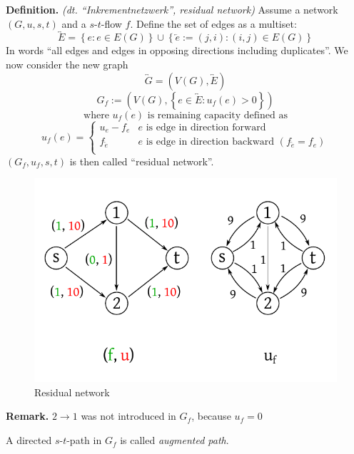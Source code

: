 \documentclass{article}
\newcommand{\set}[1]{\left\{#1\right\}}
\newcommand{\gath}[2]{$#1$-$#2$-path} %
\newcommand{\flow}[2]{$#1$-$#2$-flow}
\begin{document}
\textbf{Definition.} \emph{(dt. ``Inkrementnetzwerk'', residual network)}
  Assume a network $(G, u, s, t)$ and a \flow st $f$. Define the set of edges as a multiset:
  \[
    \overleftrightarrow E = \set{e: e \in E(G)} \cup \set{\overleftarrow e := (j, i): (i, j) \in E(G)}
  \]
  In words ``all edges and edges in opposing directions including duplicates''.
  We now consider the new graph
  \[
    \overleftrightarrow G = (V(G), \overleftrightarrow E)
  \] \[
    G_f := (V(G), \set{e \in \overleftrightarrow E: u_f(e) > 0})
  \] \[
      \text{ where } u_f(e) \text{ is remaining capacity defined as }
  \] \[
      u_f(e) = \left\{\begin{array}{lc}
        u_e - f_e & e \text{ is edge in direction forward} \\
        f_{\overleftarrow e} & e \text{ is edge in direction backward } (f_{\overleftarrow e} = f_e) \\
      \end{array}\right.
  \]
  $(G_f, u_f, s, t)$ is then called ``residual network''.

\begin{figure}[ht]
 \begin{center}
  \includegraphics{img/residual_graph.pdf}
  \caption{Residual network}
 \end{center}
\end{figure}

\textbf{Remark.} $2\rightarrow 1$ was not introduced in $G_f$, because $u_f = 0$

A directed \gath st in $G_f$ is called \emph{augmented path}.
\end{document}
